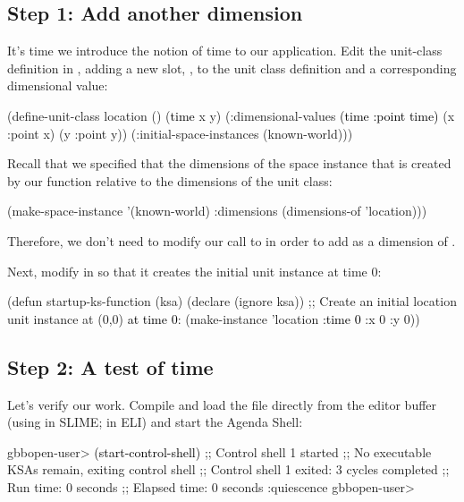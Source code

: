 \documentclass[10pt,twoside,english,pdftex]{article}
\begin{document}
\subsection*{Step 1: Add  another dimension}

It's time we introduce the notion of time to our application.  Edit the
 unit-class definition in
, adding a new slot, , to the
 unit class definition and a corresponding 
dimensional value:
%
\W\supp
\begin{example}
\textcolor{darkergray}{%
  (define-unit-class location ()
    (\textcolor{black}{time} 
     x y)
    (:dimensional-values
      \textcolor{black}{(time :point time)}
      (x :point x)
      (y :point y))
    (:initial-space-instances (known-world)))}
\end{example}

Recall that we specified that the dimensions of the 
space instance that is created by our  function
relative to the dimensions of the  unit class:
%
\W\supp
\begin{example}
\textcolor{darkergray}{%
  (make-space-instance 
      '(known-world)
      :dimensions (dimensions-of 'location)))}
\end{example}
%
Therefore, we don't need to modify our call to
 in order to add  as a dimension
of .

Next, modify  in
 so that it creates the initial
 unit instance at time 0:
%
\W\supp
\begin{example}
\textcolor{darkergray}{%
  (defun startup-ks-function (ksa)
    (declare (ignore ksa))
    ;; Create an initial location unit instance at (0,0) \textcolor{black}{at time 0}:
    (make-instance 'location \textcolor{black}{:time 0} :x 0 :y 0))}
\end{example}

\subsection*{Step 2: A test of time}

Let's verify our work.  Compile and load the
 file directly from the editor buffer
(using  in SLIME;  in ELI) and start
the Agenda Shell:
%
\W\supp
\begin{example}
\textcolor{darkergray}{%
  gbbopen-user> \textcolor{black}{(start-control-shell)}
  ;; Control shell 1 started
  ;; No executable KSAs remain, exiting control shell
  ;; Control shell 1 exited: 3 cycles completed
  ;; Run time: 0 seconds
  ;; Elapsed time: 0 seconds
  :quiescence
  gbbopen-user>}
\end{example}
\end{document}
